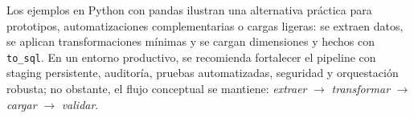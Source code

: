 \documentclass[12pt]{article}
\begin{document}
Los ejemplos en Python con pandas ilustran una alternativa práctica para prototipos, automatizaciones complementarias o cargas ligeras: se extraen datos, se aplican transformaciones mínimas y se cargan dimensiones y hechos con \texttt{to\_sql}. En un entorno productivo, se recomienda fortalecer el pipeline con staging persistente, auditoría, pruebas automatizadas, seguridad y orquestación robusta; no obstante, el flujo conceptual se mantiene: \textit{extraer} $\rightarrow$ \textit{transformar} $\rightarrow$ \textit{cargar} $\rightarrow$ \textit{validar}.

\newpage
\printbibliography
\end{document}
